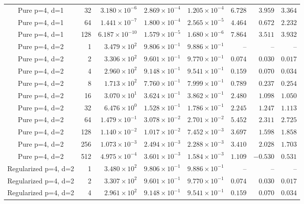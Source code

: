 \begin{longtable}{@{}crrrrrrr@{}}
Pure p=4, d=1 & 32 & $3.180\!\times\!10^{-6}$ & $2.869\!\times\!10^{-4}$ & $1.205\!\times\!10^{-4}$ & $6.728$ & $3.959$ & $3.364$ \\
Pure p=4, d=1 & 64 & $1.441\!\times\!10^{-7}$ & $1.800\!\times\!10^{-4}$ & $2.565\!\times\!10^{-5}$ & $4.464$ & $0.672$ & $2.232$ \\
Pure p=4, d=1 & 128 & $6.187\!\times\!10^{-10}$ & $1.579\!\times\!10^{-5}$ & $1.680\!\times\!10^{-6}$ & $7.864$ & $3.511$ & $3.932$ \\
Pure p=4, d=2 & 1 & $3.479\!\times\!10^{2}$ & $9.806\!\times\!10^{-1}$ & $9.886\!\times\!10^{-1}$ & -- & -- & -- \\
Pure p=4, d=2 & 2 & $3.306\!\times\!10^{2}$ & $9.601\!\times\!10^{-1}$ & $9.770\!\times\!10^{-1}$ & $0.074$ & $0.030$ & $0.017$ \\
Pure p=4, d=2 & 4 & $2.960\!\times\!10^{2}$ & $9.148\!\times\!10^{-1}$ & $9.541\!\times\!10^{-1}$ & $0.159$ & $0.070$ & $0.034$ \\
Pure p=4, d=2 & 8 & $1.713\!\times\!10^{2}$ & $7.760\!\times\!10^{-1}$ & $7.999\!\times\!10^{-1}$ & $0.789$ & $0.237$ & $0.254$ \\
Pure p=4, d=2 & 16 & $3.070\!\times\!10^{1}$ & $3.624\!\times\!10^{-1}$ & $3.862\!\times\!10^{-1}$ & $2.480$ & $1.098$ & $1.050$ \\
Pure p=4, d=2 & 32 & $6.476\!\times\!10^{0}$ & $1.528\!\times\!10^{-1}$ & $1.786\!\times\!10^{-1}$ & $2.245$ & $1.247$ & $1.113$ \\
Pure p=4, d=2 & 64 & $1.479\!\times\!10^{-1}$ & $3.078\!\times\!10^{-2}$ & $2.701\!\times\!10^{-2}$ & $5.452$ & $2.311$ & $2.725$ \\
Pure p=4, d=2 & 128 & $1.140\!\times\!10^{-2}$ & $1.017\!\times\!10^{-2}$ & $7.452\!\times\!10^{-3}$ & $3.697$ & $1.598$ & $1.858$ \\
Pure p=4, d=2 & 256 & $1.073\!\times\!10^{-3}$ & $2.494\!\times\!10^{-3}$ & $2.288\!\times\!10^{-3}$ & $3.410$ & $2.028$ & $1.703$ \\
Pure p=4, d=2 & 512 & $4.975\!\times\!10^{-4}$ & $3.601\!\times\!10^{-3}$ & $1.584\!\times\!10^{-3}$ & $1.109$ & $-0.530$ & $0.531$ \\
Regularized p=4, d=2 & 1 & $3.480\!\times\!10^{2}$ & $9.806\!\times\!10^{-1}$ & $9.886\!\times\!10^{-1}$ & -- & -- & -- \\
Regularized p=4, d=2 & 2 & $3.307\!\times\!10^{2}$ & $9.601\!\times\!10^{-1}$ & $9.770\!\times\!10^{-1}$ & $0.074$ & $0.030$ & $0.017$ \\
Regularized p=4, d=2 & 4 & $2.961\!\times\!10^{2}$ & $9.148\!\times\!10^{-1}$ & $9.541\!\times\!10^{-1}$ & $0.159$ & $0.070$ & $0.034$ \\

\end{longtable}
